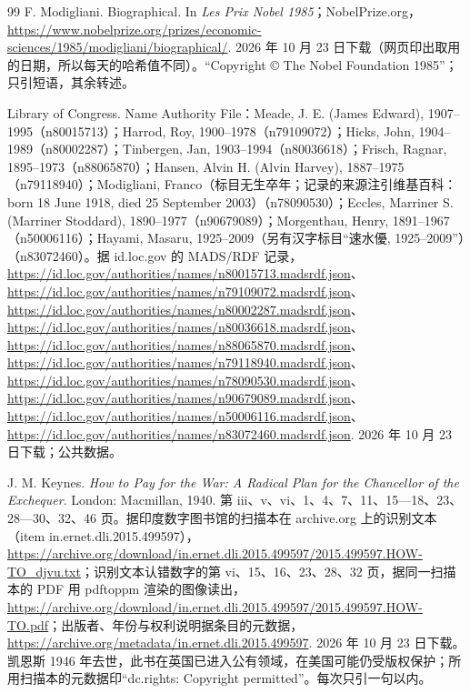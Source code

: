 \begin{thebibliography}{99}
 F. Modigliani. Biographical. In \emph{Les Prix Nobel 1985}；NobelPrize.org，\url{https://www.nobelprize.org/prizes/economic-sciences/1985/modigliani/biographical/}. 2026 年 10 月 23 日下载（网页印出取用的日期，所以每天的哈希值不同）。“Copyright © The Nobel Foundation 1985”；只引短语，其余转述。

 Library of Congress. Name Authority File：Meade, J. E. (James Edward), 1907--1995（n80015713）；Harrod, Roy, 1900--1978（n79109072）；Hicks, John, 1904--1989（n80002287）；Tinbergen, Jan, 1903--1994（n80036618）；Frisch, Ragnar, 1895--1973（n88065870）；Hansen, Alvin H. (Alvin Harvey), 1887--1975（n79118940）；Modigliani, Franco（标目无生卒年；记录的来源注引维基百科：born 18 June 1918, died 25 September 2003）（n78090530）；Eccles, Marriner S. (Marriner Stoddard), 1890--1977（n90679089）；Morgenthau, Henry, 1891--1967（n50006116）；Hayami, Masaru, 1925--2009（另有汉字标目“速水優, 1925--2009”）（n83072460）。据 id.loc.gov 的 MADS/RDF 记录，\url{https://id.loc.gov/authorities/names/n80015713.madsrdf.json}、\url{https://id.loc.gov/authorities/names/n79109072.madsrdf.json}、\url{https://id.loc.gov/authorities/names/n80002287.madsrdf.json}、\url{https://id.loc.gov/authorities/names/n80036618.madsrdf.json}、\url{https://id.loc.gov/authorities/names/n88065870.madsrdf.json}、\url{https://id.loc.gov/authorities/names/n79118940.madsrdf.json}、\url{https://id.loc.gov/authorities/names/n78090530.madsrdf.json}、\url{https://id.loc.gov/authorities/names/n90679089.madsrdf.json}、\url{https://id.loc.gov/authorities/names/n50006116.madsrdf.json}、\url{https://id.loc.gov/authorities/names/n83072460.madsrdf.json}. 2026 年 10 月 23 日下载；公共数据。

 J. M. Keynes. \emph{How to Pay for the War: A Radical Plan for the Chancellor of the Exchequer}. London: Macmillan, 1940. 第 iii、v、vi、1、4、7、11、15—18、23、28—30、32、46 页。据印度数字图书馆的扫描本在 archive.org 上的识别文本（item in.ernet.dli.2015.499597），\url{https://archive.org/download/in.ernet.dli.2015.499597/2015.499597.HOW-TO_djvu.txt}；识别文本认错数字的第 vi、15、16、23、28、32 页，据同一扫描本的 PDF 用 pdftoppm 渲染的图像读出，\url{https://archive.org/download/in.ernet.dli.2015.499597/2015.499597.HOW-TO.pdf}；出版者、年份与权利说明据条目的元数据，\url{https://archive.org/metadata/in.ernet.dli.2015.499597}. 2026 年 10 月 23 日下载。凯恩斯 1946 年去世，此书在英国已进入公有领域，在美国可能仍受版权保护；所用扫描本的元数据印“dc.rights: Copyright permitted”。每次只引一句以内。


\end{thebibliography}
